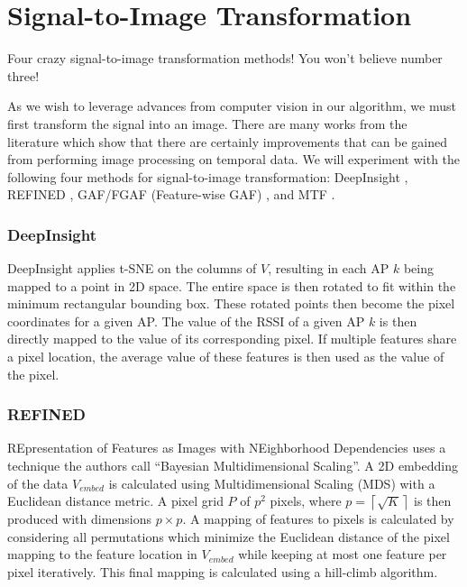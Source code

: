 \section{Signal-to-Image Transformation}\label{sec:methodology-signal-to-image}

Four crazy signal-to-image transformation methods! You won't believe number three!

As we wish to leverage advances from computer vision in our algorithm, we must first transform the signal into an image.
There are many works from the literature which show that there are certainly improvements that can be gained from performing image processing on temporal data.
We will experiment with the following four methods for signal-to-image transformation: DeepInsight \cite{sharma2019deepinsight}, REFINED \cite{bazgir2020representation}, GAF/FGAF (Feature-wise GAF) \cite{wang2015imaging,satyawan2023cnns}, and MTF \cite{wang2015imaging}.

\subsubsection{DeepInsight}

DeepInsight \cite{sharma2019deepinsight} applies t-SNE on the columns of $V$, resulting in each AP $k$ being mapped to a point in 2D space.
The entire space is then rotated to fit within the minimum rectangular bounding box.
These rotated points then become the pixel coordinates for a given AP.
The value of the RSSI of a given AP $k$ is then directly mapped to the value of its corresponding pixel.
If multiple features share a pixel location, the average value of these features is then used as the value of the pixel.

\subsubsection{REFINED}

REpresentation of Features as Images with NEighborhood Dependencies \cite{bazgir2020representation} uses a technique the authors call ``Bayesian Multidimensional Scaling''.
A 2D embedding of the data $V_{embed}$ is calculated using Multidimensional Scaling (MDS) with a Euclidean distance metric.
A pixel grid $P$ of $p^2$ pixels, where $p=\left\lceil \sqrt{K} \right\rceil$ is then produced with dimensions $p \times p$.
A mapping of features to pixels is calculated by considering all permutations which minimize the Euclidean distance of the pixel mapping to the feature location in $V_{embed}$ while keeping at most one feature per pixel iteratively.
This final mapping is calculated using a hill-climb algorithm.

